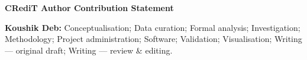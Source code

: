 
\noindent\textbf{CRediT Author Contribution Statement}

\medskip
\noindent
\textbf{Koushik Deb:}
Conceptualisation;
Data curation;
Formal analysis;
Investigation;
Methodology;
Project administration;
Software;
Validation;
Visualisation;
Writing --- original draft;
Writing --- review \& editing.
